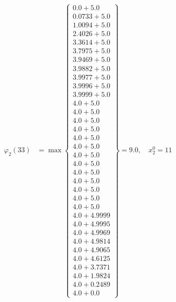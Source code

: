 \documentclass{article}
\begin{document}
\begin{align*}
\varphi_{2}(33) &= \max \left\{ \begin{array}{c}
0.0 + 5.0 \\
 0.0733 + 5.0 \\
 1.0094 + 5.0 \\
 2.4026 + 5.0 \\
 3.3614 + 5.0 \\
 3.7975 + 5.0 \\
 3.9469 + 5.0 \\
 3.9882 + 5.0 \\
 3.9977 + 5.0 \\
 3.9996 + 5.0 \\
 3.9999 + 5.0 \\
 4.0 + 5.0 \\
 4.0 + 5.0 \\
 4.0 + 5.0 \\
 4.0 + 5.0 \\
 4.0 + 5.0 \\
 4.0 + 5.0 \\
 4.0 + 5.0 \\
 4.0 + 5.0 \\
 4.0 + 5.0 \\
 4.0 + 5.0 \\
 4.0 + 5.0 \\
 4.0 + 5.0 \\
 4.0 + 5.0 \\
 4.0 + 4.9999 \\
 4.0 + 4.9995 \\
 4.0 + 4.9969 \\
 4.0 + 4.9814 \\
 4.0 + 4.9065 \\
 4.0 + 4.6125 \\
 4.0 + 3.7371 \\
 4.0 + 1.9824 \\
 4.0 + 0.2489 \\
 4.0 + 0.0
\end{array} \right\}=9.0, \quad x_{2}^0=11\\
  

\end{align*}
\end{document}
